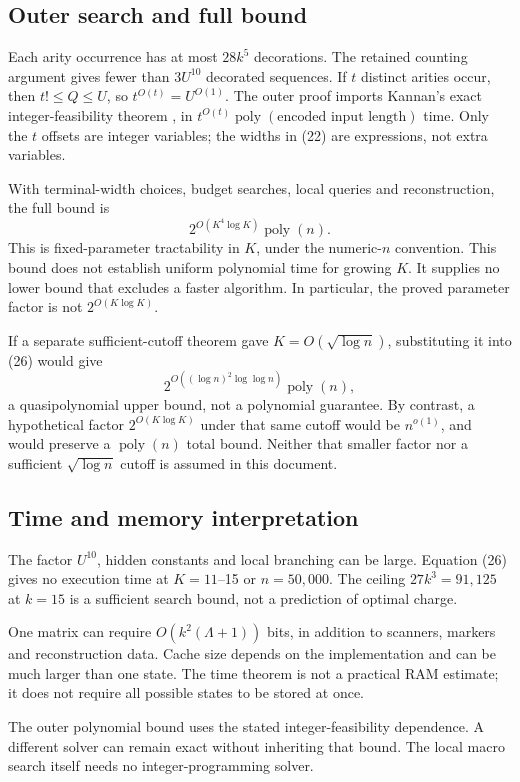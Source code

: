 \documentclass[11pt,letterpaper]{article}
\begin{document}
\subsection{Outer search and full bound}
Each arity occurrence has at most \(28k^5\) decorations.
The retained counting argument gives fewer than \(3U^{10}\)
decorated sequences. If \(t\) distinct arities occur, then
\(t!\le Q\le U\), so \(t^{O(t)}=U^{O(1)}\).
The outer proof imports Kannan's exact integer-feasibility theorem
\cite[Theorem~5.4]{kannan}, in
\(t^{O(t)}\operatorname{poly}(\text{encoded input length})\) time.
Only the \(t\) offsets are integer variables; the widths in (22)
are expressions, not extra variables.

With terminal-width choices, budget searches, local queries and
reconstruction, the full bound is
\[
\boxed{2^{O(K^4\log K)}\operatorname{poly}(n).}\tag{26}
\]
This is fixed-parameter tractability in \(K\), under the
numeric-\(n\) convention. This bound does not establish uniform
polynomial time for growing \(K\). It supplies no lower bound that
excludes a faster algorithm.
In particular, the proved parameter factor is not
\(2^{O(K\log K)}\).

If a separate sufficient-cutoff theorem gave
\(K=O(\sqrt{\log n})\), substituting it into (26) would give
\[
2^{O((\log n)^2\log\log n)}\operatorname{poly}(n),
\]
a quasipolynomial upper bound, not a polynomial guarantee.
By contrast, a hypothetical factor \(2^{O(K\log K)}\) under that
same cutoff would be \(n^{o(1)}\), and would preserve a
\(\operatorname{poly}(n)\) total bound. Neither that smaller factor
nor a sufficient \(\sqrt{\log n}\) cutoff is assumed in this document.

\subsection{Time and memory interpretation}
The factor \(U^{10}\), hidden constants and local branching can be
large. Equation (26) gives no execution time at \(K=11\)--15 or
\(n=50{,}000\). The ceiling \(27k^3=91{,}125\) at \(k=15\)
is a sufficient search bound, not a prediction of optimal charge.

One matrix can require \(O(k^2(\Lambda+1))\) bits, in addition to
scanners, markers and reconstruction data. Cache size depends on
the implementation and can be much larger than one state.
The time theorem is not a practical RAM estimate; it does not require
all possible states to be stored at once.

The outer polynomial bound uses the stated integer-feasibility
dependence. A different solver can remain exact without inheriting
that bound. The local macro search itself needs no
integer-programming solver.
\end{document}
